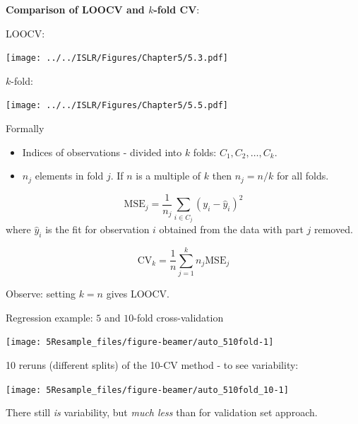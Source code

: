 \documentclass[
  10pt,
  ignorenonframetext,
]{beamer}
\providecommand{\tightlist}{%
  \setlength{\itemsep}{0pt}\setlength{\parskip}{0pt}}
\begin{document}
\begin{frame}
\textbf{Comparison of LOOCV and \(k\)-fold CV}:

\centering

LOOCV:

\texttt{[image: ../../ISLR/Figures/Chapter5/5.3.pdf]}

\(k\)-fold:

\texttt{[image: ../../ISLR/Figures/Chapter5/5.5.pdf]}
\end{frame}

\begin{frame}
\begin{block}{Formally}
\protect\hypertarget{formally}{}
\begin{itemize}
\tightlist
\item
  Indices of observations - divided into \(k\) folds:
  \(C_1, C_2, \ldots, C_k\).
\item
  \(n_j\) elements in fold \(j\). If \(n\) is a multiple of \(k\) then
  \(n_j=n/k\) for all folds.
\end{itemize}

\[\text{MSE}_j=\frac{1}{n_j}\sum_{i\in C_j}(y_i-\hat{y}_i)^2\] where
\(\hat{y}_i\) is the fit for observation \(i\) obtained from the data
with part \(j\) removed.

\[\text{CV}_{k}=\frac{1}{n} \sum_{j=1}^k n_j \text{MSE}_j\]

Observe: setting \(k=n\) gives LOOCV.
\end{block}
\end{frame}

\begin{frame}
\begin{block}{Regression example: \(5\) and \(10\)-fold
cross-validation}
\protect\hypertarget{regression-example-5-and-10-fold-cross-validation}{}
\(~\)

\begin{center}\texttt{[image: 5Resample\_files/figure-beamer/auto\_510fold-1]} \end{center}

\normalsize
\end{block}
\end{frame}

\begin{frame}
10 reruns (different splits) of the 10-CV method - to see variability:

\begin{center}\texttt{[image: 5Resample\_files/figure-beamer/auto\_510fold\_10-1]} \end{center}

There still \emph{is} variability, but \emph{much less} than for
validation set approach.
\end{frame}
\end{document}
